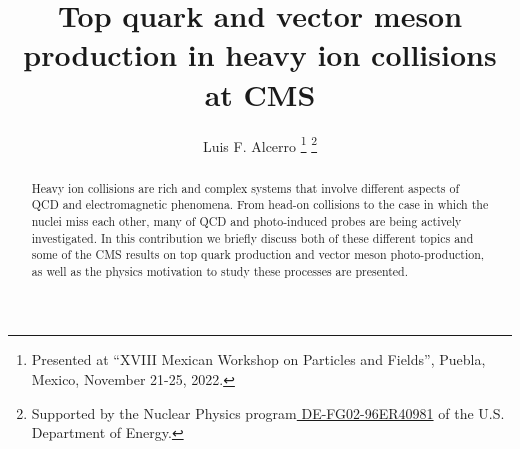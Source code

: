 \documentclass{rmf-d}
\begin{document}

%
%
\title{  Top quark and vector meson production in heavy ion collisions at CMS
\vspace{-6pt}}
\author{  Luis F. Alcerro
\thanks{Presented at ``XVIII Mexican Workshop on Particles and Fields'', Puebla, Mexico, November 21-25, 2022.}
\thanks{Supported by the Nuclear Physics program\href{https://pamspublic.science.energy.gov/WebPAMSExternal/Interface/Common/ViewPublicAbstract.aspx?rv=00d4fe0f-48a0-4d4a-baf1-c70867d9e499&rtc=24&PRoleId=10}{ DE-FG02-96ER40981} of the U.S. Department of Energy.}
}

\address{   Department of Physics \& Astronomy, The University of Kansas, Malott Hall, room 1082
1251 Wescoe Hall Dr.
Lawrence, KS 66045, US    }
%
%
\author{ }
\address{ }
\author{ }
\address{ }
\author{ }
\address{ }
\author{ }
\address{ }
\author{ }
\address{ }
\maketitle
%
%
\begin{abstract}
\vspace{1em} 
%
%
Heavy ion collisions are rich and complex systems that involve different aspects of QCD and electromagnetic phenomena. From head-on collisions to the case in which the nuclei miss each other, many of QCD and photo-induced probes are being actively investigated. 
In this contribution we briefly discuss both of these different topics and some of the CMS results on top quark production and vector meson photo-production, as well as the physics motivation to study these processes are presented. 
\vspace{1em}
\end{abstract}
\end{document}
